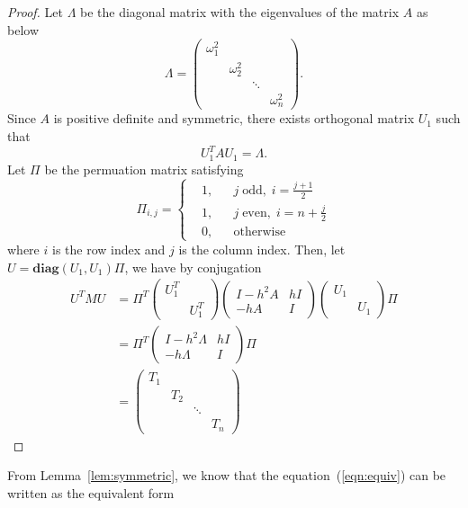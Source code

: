 \documentclass[11pt,fceqn]{article}
\numberwithin{equation}{section}
\theoremstyle{definition}
\begin{document}
\begin{proof}
Let $\Lambda$ be the diagonal matrix with the eigenvalues of the matrix $A$ as below
$$
\Lambda =\begin{pmatrix} \omega^{2}_{1} & & & \\ &\omega^{2}_{2} & & \\ & &\ddots & \\ & & & \omega^{2}_{n} \end{pmatrix}.
$$
Since $A$ is positive definite and symmetric, there exists orthogonal matrix $U_{1}$ such that 
$$
U_{1}^{T}AU_{1} =  \Lambda.
$$
Let $\Pi$ be the permuation matrix satisfying 
$$
\Pi_{i,j} = \left\{
      \begin{aligned}
       &1, && j\;\text{odd},\;  i=\frac{j+1}{2} \\
       &1, && j\;\text{even},\; i=n+\frac{j}{2} \\
       &0, && \text{otherwise}
      \end{aligned}
      \right.   
$$
where $i$ is the row index and $j$ is the column index. Then, let $U = \mathbf{diag}(U_{1},U_{1})\Pi$, we have by conjugation
$$
\begin{aligned}
U^{T}MU & =\Pi^{T} \begin{pmatrix} U_{1}^{T} & \\ & U_{1}^{T}\end{pmatrix} \begin{pmatrix}I-h^{2}A & hI \\ -hA & I \end{pmatrix} \begin{pmatrix} U_{1} & \\ & U_{1}\end{pmatrix}\Pi \\
        & = \Pi^{T} \begin{pmatrix} I-h^2\Lambda & hI \\ -h\Lambda & I \end{pmatrix} \Pi\\
        & = \begin{pmatrix} T_{1} & & & \\ &T_{2} & & \\ & &\ddots & \\ & & & T_{n} \end{pmatrix}  
\end{aligned}
$$
\end{proof}
From Lemma~\ref{lem:symmetric}, we know that the equation~(\ref{eqn:equiv}) can be written as the equivalent form
\end{document}
